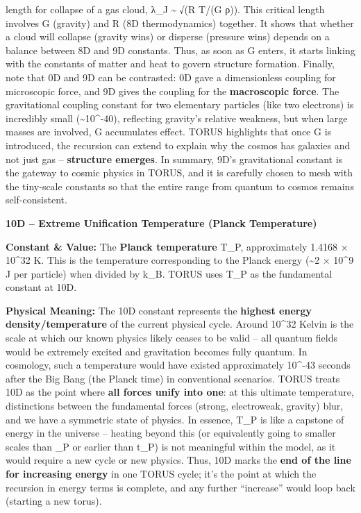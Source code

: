 \documentclass[
]{article}
\begin{document}
{{length} for collapse of a gas cloud, λ\_J \textasciitilde{} √(R T/(G
ρ)). This critical length involves G (gravity) and R (8D thermodynamics)
together\hspace{0pt}. It shows that whether a cloud will collapse
(gravity wins) or disperse (pressure wins) depends on a balance between
8D and 9D constants. Thus, as soon as G enters, it starts linking with
the constants of matter and heat to govern structure formation. Finally,
note that 0D and 9D can be contrasted: 0D gave a dimensionless coupling
for microscopic force, and 9D gives the coupling for the
\textbf{macroscopic force}. The gravitational coupling constant for two
elementary particles (like two electrons) is incredibly small
(\textasciitilde10\^{}-40), reflecting gravity's relative weakness, but
when large masses are involved, G accumulates effect. TORUS highlights
that once G is introduced, the recursion can extend to explain why the
cosmos has galaxies and not just gas -- \textbf{structure emerges}. In
summary, 9D's gravitational constant is the gateway to cosmic physics in
TORUS, and it is carefully chosen to mesh with the tiny-scale constants
so that the entire range from quantum to cosmos remains self-consistent.

\textbf{10D -- Extreme Unification Temperature (Planck Temperature)}

\textbf{Constant \& Value:} The \textbf{Planck temperature} T\_P,
approximately 1.4168 × 10\^{}32 K\hspace{0pt}. This is the temperature
corresponding to the Planck energy (\textasciitilde2 × 10\^{}9 J per
particle) when divided by k\_B. TORUS uses T\_P as the fundamental
constant at 10D.

\textbf{Physical Meaning:} The 10D constant represents the
\textbf{highest energy density/temperature} of the current physical
cycle. Around 10\^{}32 Kelvin is the scale at which our known physics
likely ceases to be valid -- all quantum fields would be extremely
excited and gravitation becomes fully quantum. In cosmology, such a
temperature would have existed approximately 10\^{}-43 seconds after the
Big Bang (the Planck time) in conventional scenarios. TORUS treats 10D
as the point where \textbf{all forces unify into one}: at this ultimate
temperature, distinctions between the fundamental forces (strong,
electroweak, gravity) blur, and we have a symmetric state of
physics\hspace{0pt}. In essence, T\_P is like a capstone of energy in
the universe -- heating beyond this (or equivalently going to smaller
scales than \ell\_P or earlier than t\_P) is not meaningful within the
model, as it would require a new cycle or new physics. Thus, 10D marks
the \textbf{end of the line for increasing energy} in one TORUS cycle;
it's the point at which the recursion in energy terms is complete, and
any further ``increase'' would loop back (starting a new torus).

}
\end{document}
